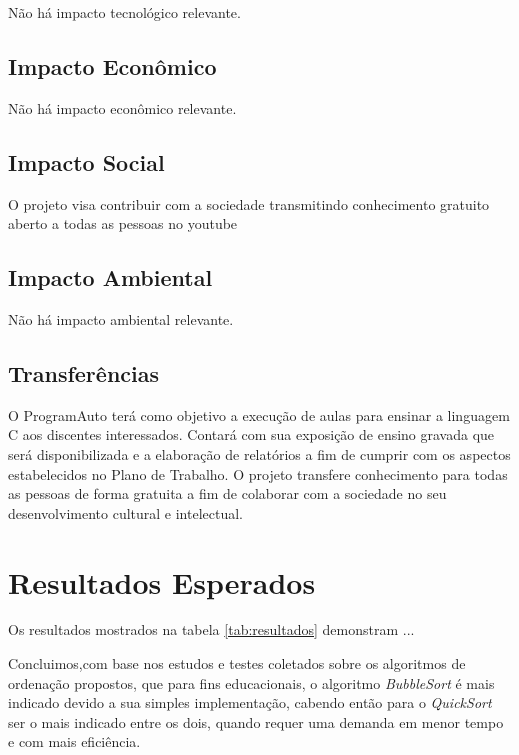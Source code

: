 \documentclass[a4paper,10pt]{article} %
\begin{document}
Não há impacto tecnológico relevante.

\subsection{Impacto Econômico}

Não há impacto econômico relevante.

\subsection{Impacto Social}

O projeto visa contribuir com a sociedade transmitindo conhecimento gratuito aberto a todas as pessoas
no youtube

\subsection{Impacto Ambiental}

Não há impacto ambiental relevante.

\subsection{Transferências}

O ProgramAuto terá como objetivo a execução de aulas para ensinar a linguagem C aos discentes interessados. Contará com sua exposição de ensino gravada que será disponibilizada e a elaboração de relatórios a fim de cumprir com os aspectos estabelecidos no Plano de Trabalho. O projeto transfere conhecimento para todas as pessoas de forma gratuita a fim de colaborar com a sociedade no seu desenvolvimento cultural e intelectual.


\section{Resultados Esperados}

Os resultados mostrados na tabela \ref{tab:resultados} demonstram ...

    Concluimos,com base nos estudos e testes coletados sobre os algoritmos de ordenação propostos, que para fins educacionais, o algoritmo \textit{BubbleSort} é mais indicado devido a sua simples implementação, cabendo então para o \textit{QuickSort} ser o mais indicado entre os dois, quando requer uma demanda em menor tempo e com mais eficiência.
\end{document}
